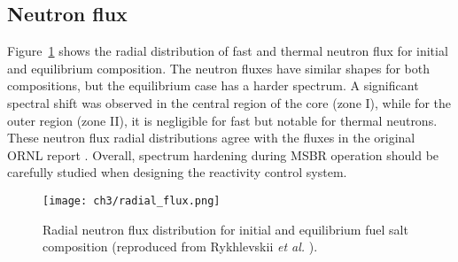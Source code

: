 \subsection{Neutron flux}
Figure~\ref{fig:radial_flux} shows the radial distribution of fast and thermal 
neutron flux for initial and equilibrium composition. The neutron fluxes have 
similar shapes for both compositions, but the equilibrium case has a harder 
spectrum. A significant spectral shift was observed in the central region of 
the core (zone I), while for the outer region (zone II), it is negligible for 
fast but notable for thermal neutrons. These neutron flux radial distributions 
agree with the fluxes in the original ORNL report 
\cite{robertson_conceptual_1971}. 
Overall, spectrum hardening during \gls{MSBR} operation should be carefully 
studied when designing the reactivity control system.
\begin{figure}[ht!] %
	\texttt{[image: ch3/radial\_flux.png]}
	\caption{Radial neutron flux distribution for initial and equilibrium fuel 
	salt composition (reproduced from Rykhlevskii \emph{et al.} 
	\cite{rykhlevskii_modeling_2019}).}
	\label{fig:radial_flux}
\end{figure}

